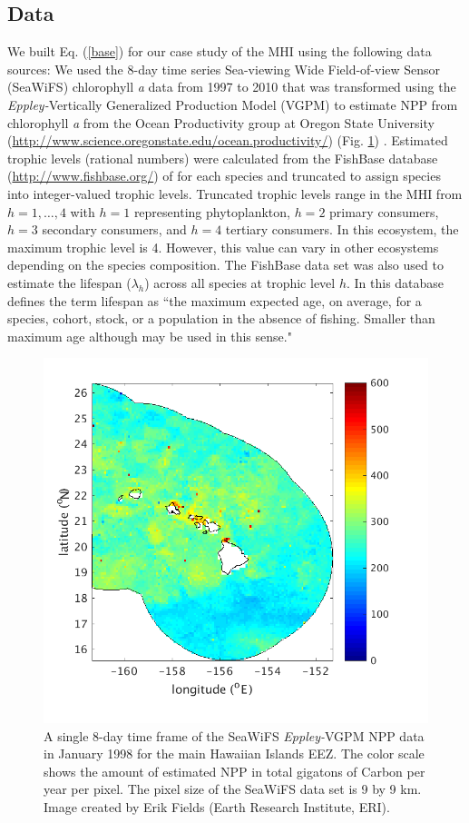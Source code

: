 \documentclass[oneside,12pt,final]{sty/ucthesis-CA2012}
\let\cite\citep                             %
\begin{document}
\begin{mainmatter}
\subsection*{Data}
We built Eq. (\ref{base}) for our case study of the MHI using the following data sources: We used the 8-day time series Sea-viewing Wide Field-of-view Sensor (SeaWiFS) chlorophyll \textit{a} data from 1997 to 2010 that was transformed using the \textit{Eppley-}Vertically Generalized Production Model (VGPM) to estimate NPP from chlorophyll \textit{a} from the Ocean Productivity group at Oregon State University (\url{http://www.science.oregonstate.edu/ocean.productivity/}) (Fig. \ref{SeaWiFSmhi}) \cite{behrenfeld1997photosynthetic}. Estimated trophic levels (rational numbers) were calculated from the FishBase database (\url{http://www.fishbase.org/}) of \citet{fishbase} for each species and truncated to assign species into integer-valued trophic levels. Truncated trophic levels range in the MHI from $h=1,\dots,4$ with $h=1$ representing phytoplankton, $h=2$ primary consumers, $h=3$ secondary consumers, and $h=4$ tertiary consumers. In this ecosystem, the maximum trophic level is 4. However, this value can vary in other ecosystems depending on the species composition. The \citet{fishbase} FishBase data set was also used to estimate the lifespan ($\lambda_h$) across all species at trophic level $h$. In this database \citet{fishbase} defines the term lifespan as ``the maximum expected age, on average, for a species, cohort, stock, or a population in the absence of fishing. Smaller than maximum age although may be used in this sense."

\begin{figure}[H]
     \centering
       \includegraphics[width=.7\textwidth]{fig/SeaWiFSmhi}
    \caption{A single 8-day time frame of the SeaWiFS \textit{Eppley-}VGPM NPP data in January 1998 for the main Hawaiian Islands EEZ. The color scale shows the amount of estimated NPP in total gigatons of Carbon per year per pixel. The pixel size of the SeaWiFS data set is 9 by 9 km. Image created by Erik Fields (Earth Research Institute, ERI).}
    \label{SeaWiFSmhi}
\end{figure}


\end{mainmatter}
\end{document}
